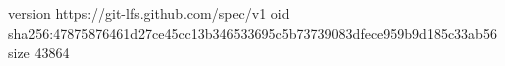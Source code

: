 version https://git-lfs.github.com/spec/v1
oid sha256:47875876461d27ce45cc13b346533695c5b73739083dfece959b9d185c33ab56
size 43864
